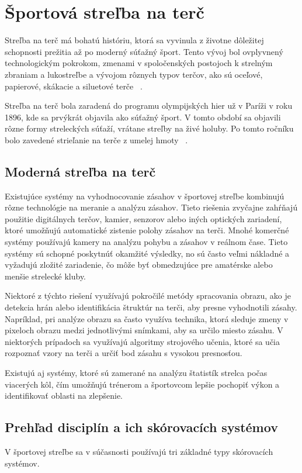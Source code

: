 \section {Športová streľba na terč}
Streľba na terč má bohatú históriu, ktorá sa vyvinula z životne dôležitej schopnosti prežitia 
až po moderný súťažný šport. Tento vývoj bol ovplyvnený technologickým pokrokom, zmenami v 
spoločenských postojoch k strelným zbraniam a lukostreľbe a vývojom rôznych typov terčov, ako 
sú oceľové, papierové, skákacie a siluetové terče ~\cite{target_shooting}.

Streľba na terč bola zaradená do programu olympijských hier už v Paríži v roku 1896, kde sa 
prvýkrát objavila ako súťažný šport. V tomto období sa objavili rôzne formy streleckých súťaží, 
vrátane streľby na živé holuby. Po tomto ročníku bolo zavedené strieľanie na terče z umelej 
hmoty ~\cite{target_shooting_olympic}.

\subsection{Moderná streľba na terč}
Existujúce systémy na vyhodnocovanie zásahov v športovej streľbe kombinujú rôzne technológie na 
meranie a analýzu zásahov. Tieto riešenia zvyčajne zahŕňajú použitie digitálnych terčov, kamier, 
senzorov alebo iných optických zariadení, ktoré umožňujú automatické zistenie polohy zásahov na terči. 
Mnohé komerčné systémy používajú kamery na analýzu pohybu a zásahov v reálnom čase. Tieto systémy 
sú schopné poskytnúť okamžité výsledky, no sú často veľmi nákladné a vyžadujú zložité zariadenie, 
čo môže byť obmedzujúce pre amatérske alebo menšie strelecké kluby.

Niektoré z týchto riešení využívajú pokročilé metódy spracovania obrazu, ako je detekcia hrán alebo 
identifikácia štruktúr na terči, aby presne vyhodnotili zásahy. Napríklad, pri analýze obrazu sa často 
využíva technika, ktorá sleduje zmeny v pixeloch obrazu medzi jednotlivými snímkami, aby sa určilo 
miesto zásahu. V niektorých prípadoch sa využívajú algoritmy strojového učenia, ktoré sa učia rozpoznať 
vzory na terči a určiť bod zásahu s vysokou presnosťou.

Existujú aj systémy, ktoré sú zamerané na analýzu štatistík strelca počas viacerých kôl, čím umožňujú 
trénerom a športovcom lepšie pochopiť výkon a identifikovať oblasti na zlepšenie.

\subsection{Prehľad disciplín a ich skórovacích systémov}
V športovej streľbe sa v súčasnosti používajú tri základné typy skórovacích systémov.


